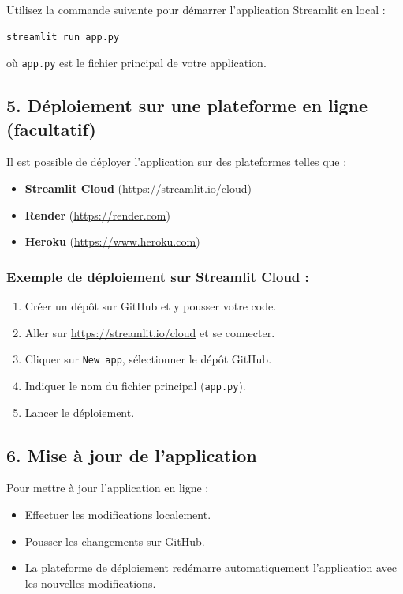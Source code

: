 Utilisez la commande suivante pour démarrer l’application Streamlit en local :

\begin{verbatim}
streamlit run app.py
\end{verbatim}

où \texttt{app.py} est le fichier principal de votre application.

\subsection{5. Déploiement sur une plateforme en ligne (facultatif)}

Il est possible de déployer l'application sur des plateformes telles que :

\begin{itemize}
  \item \textbf{Streamlit Cloud} (\url{https://streamlit.io/cloud})
  \item \textbf{Render} (\url{https://render.com})
  \item \textbf{Heroku} (\url{https://www.heroku.com})
\end{itemize}

\subsubsection*{Exemple de déploiement sur Streamlit Cloud :}

\begin{enumerate}
  \item Créer un dépôt sur GitHub et y pousser votre code.
  \item Aller sur \url{https://streamlit.io/cloud} et se connecter.
  \item Cliquer sur \texttt{New app}, sélectionner le dépôt GitHub.
  \item Indiquer le nom du fichier principal (\texttt{app.py}).
  \item Lancer le déploiement.
\end{enumerate}

\subsection{6. Mise à jour de l'application}

Pour mettre à jour l’application en ligne :

\begin{itemize}
  \item Effectuer les modifications localement.
  \item Pousser les changements sur GitHub.
  \item La plateforme de déploiement redémarre automatiquement l’application avec les nouvelles modifications.
\end{itemize}

